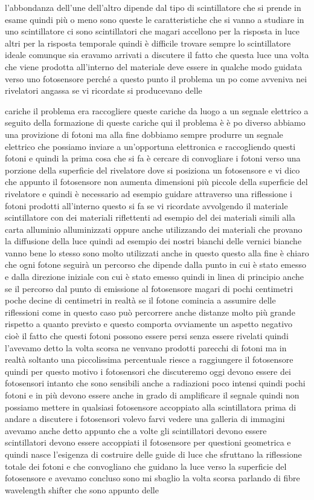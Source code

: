 l'abbondanza dell'une dell'altro dipende dal tipo di scintillatore che si prende in esame quindi più o meno sono queste le caratteristiche che si vanno a studiare in uno scintillatore ci sono scintillatori che magari accellono per la risposta in luce altri per la risposta temporale quindi è difficile trovare sempre lo scintillatore ideale comunque sia eravamo arrivati a discutere il fatto che questa luce una volta che viene prodotta all'interno del materiale deve essere in qualche modo guidata verso uno fotosensore perché a questo punto il problema un po come avveniva nei rivelatori angassa se vi ricordate si producevano delle 

cariche il problema era raccogliere queste cariche da luogo a un segnale elettrico a seguito della formazione di queste cariche qui il problema è è po diverso abbiamo una provizione di fotoni ma alla fine dobbiamo sempre produrre un segnale elettrico che possiamo inviare a un'opportuna elettronica e raccogliendo questi fotoni e quindi la prima cosa che si fa è cercare di convogliare i fotoni verso una porzione della superficie del rivelatore dove si posiziona un fotosensore e vi dico che appunto il fotosensore non aumenta dimensioni più piccole della superficie del rivelatore e quindi è necessario ad esempio guidare attraverso una riflessione i fotoni prodotti all'interno questo si fa se vi ricordate avvolgendo il materiale scintillatore con dei materiali riflettenti ad esempio del dei materiali simili alla carta alluminio alluminizzati oppure anche utilizzando dei materiali che provano la diffusione della luce quindi ad esempio dei nostri bianchi delle vernici bianche vanno bene lo stesso sono molto utilizzati anche in questo questo alla fine è chiaro che ogni fotone seguirà un percorso che dipende dalla punto in cui è stato emesso e dalla direzione iniziale con cui è stato emesso quindi in linea di principio anche se il percorso dal punto di emissione al fotosensore magari di pochi centimetri poche decine di centimetri in realtà se il fotone comincia a assumire delle riflessioni come in questo caso può percorrere anche distanze molto più grande rispetto a quanto previsto e questo comporta ovviamente un aspetto negativo cioè il fatto che questi fotoni possono essere persi senza essere rivelati quindi l'avevamo detto la volta scorsa ne venvano prodotti parecchi di fotoni ma in realtà soltanto una piccolissima percentuale riesce a raggiungere il fotosensore quindi per questo motivo i fotosensori che discuteremo oggi devono essere dei fotosensori intanto che sono sensibili anche a radiazioni poco intensi quindi pochi fotoni e in più devono essere anche in grado di amplificare il segnale quindi non possiamo mettere in qualsiasi fotosensore accoppiato alla scintillatora prima di andare a discutere i fotosensori volevo farvi vedere una galleria di immagini avevamo anche detto appunto che a volte gli scintillatori devono essere scintillatori devono essere accoppiati il fotosensore per questioni geometrica e quindi nasce l'esigenza di costruire delle guide di luce che sfruttano la riflessione totale dei fotoni e che convogliano che guidano la luce verso la superficie del fotosensore e avevamo concluso sono mi sbaglio la volta scorsa parlando di fibre wavelength shifter che sono appunto delle 